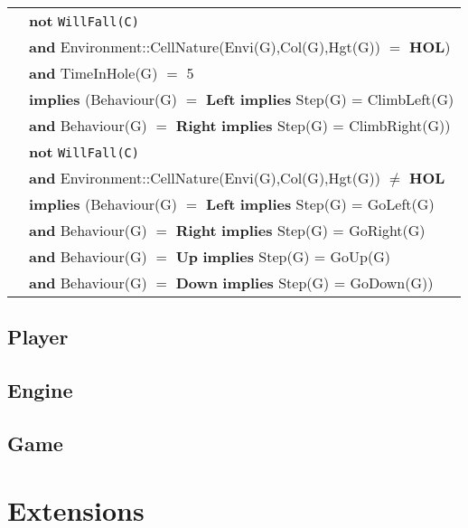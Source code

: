 \documentclass[8pt]{article}
\begin{document}
{\begin{longtable}{rl}
  & \textbf{not} \texttt{WillFall(C)} \\
  & \quad\quad \textbf{and} \textrm{Environment::CellNature(Envi(G),Col(G),Hgt(G))} $=$ \textbf{HOL}) \\
  & \quad\quad \textbf{and} \textrm{TimeInHole(G)} $=$ 5 \\
  & \quad\quad \textbf{implies} (\textrm{Behaviour(G)} $=$ \textbf{Left} \textbf{implies} \textrm{Step(G)} = \textrm{ClimbLeft(G)} \\
  & \quad\quad\quad\quad \textbf{and} \textrm{Behaviour(G)} $=$ \textbf{Right} \textbf{implies} \textrm{Step(G)} = \textrm{ClimbRight(G)}) \\
  & \textbf{not} \texttt{WillFall(C)} \\
  & \quad\quad \textbf{and} \textrm{Environment::CellNature(Envi(G),Col(G),Hgt(G))} $\neq$ \textbf{HOL} \\
  & \quad\quad \textbf{implies} (\textrm{Behaviour(G)} $=$ \textbf{Left} \textbf{implies} \textrm{Step(G)} = \textrm{GoLeft(G)} \\
  & \quad\quad\quad\quad \textbf{and} \textrm{Behaviour(G)} $=$ \textbf{Right} \textbf{implies} \textrm{Step(G)} = \textrm{GoRight(G)}\\
  & \quad\quad\quad\quad \textbf{and} \textrm{Behaviour(G)} $=$ \textbf{Up} \textbf{implies} \textrm{Step(G)} = \textrm{GoUp(G)}\\
  & \quad\quad\quad\quad \textbf{and} \textrm{Behaviour(G)} $=$ \textbf{Down} \textbf{implies} \textrm{Step(G)} = \textrm{GoDown(G)})\\
\end{longtable}}

\subsection{Player}

\subsection{Engine}

\subsection{Game}

\section{Extensions}
\end{document}
